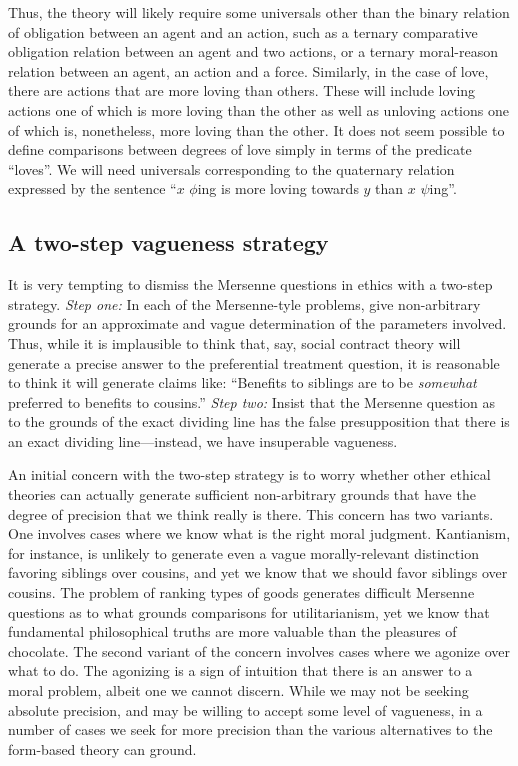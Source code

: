Thus, the theory will likely require some universals other than the binary relation of obligation
between an agent and an action, such as a ternary comparative obligation relation between an agent and two 
actions, or a ternary moral-reason relation between an agent, an action and a force. 
Similarly, in the case of love, there are actions that are more loving than others. These will include
loving actions one of which is more loving than the other as well as unloving actions one of which is,
nonetheless, more loving than the other. It does not seem possible to define comparisons between degrees of 
love simply in terms of the predicate ``loves''. We will need universals corresponding to the quaternary 
relation expressed by the sentence ``$x$ $\phi$ing is more loving towards $y$ than $x$ $\psi$ing''.

\subsection{A two-step vagueness strategy}\label{sec:two-step-vagueness}
It is very tempting to dismiss the Mersenne questions in ethics with a two-step strategy. \textit{Step one:} In each of the Mersenne-tyle
problems, give non-arbitrary grounds for 
an approximate and vague determination of the parameters involved. Thus, while it is implausible to think that, say, social contract theory
will generate a precise answer to the preferential treatment question, it is reasonable to think it will generate claims like: ``Benefits to 
siblings are to be \textit{somewhat} preferred to benefits to cousins.'' \textit{Step two:} Insist that the Mersenne question as to the grounds
of the exact dividing line has the false presupposition that there is an exact dividing line---instead, we have insuperable vagueness.

An initial concern with the two-step strategy is to worry whether other ethical theories can actually generate sufficient non-arbitrary grounds
that have the degree of precision that we think really is there. 
This concern has two variants. One involves cases where we know what is the right moral judgment.
Kantianism, for instance, is unlikely to generate even a vague morally-relevant 
distinction favoring siblings over cousins, and yet we know that we should favor siblings over cousins. The problem of ranking types of goods generates difficult 
Mersenne questions as to what grounds comparisons for utilitarianism, yet we know that fundamental philosophical truths are more valuable than the 
pleasures of chocolate. The second variant of the concern involves cases where we agonize over what to do. The agonizing is a sign of intuition
that there is an answer to a moral problem, albeit one we cannot discern. While we may not be seeking absolute precision, and may be willing
to accept some level of vagueness, in a number of cases we seek for more precision than the various alternatives to the form-based theory can ground. 

